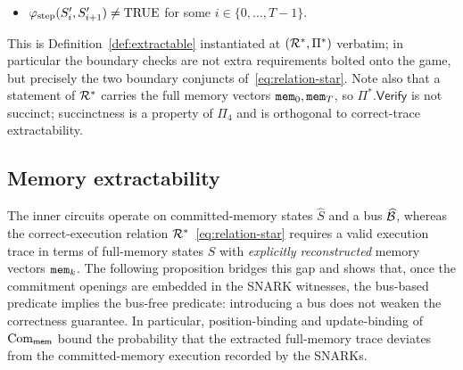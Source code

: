 \begin{remark}
\begin{enumerate}
\begin{itemize}
        $\mem_T' \neq \mem_T$; or
      \item $\varphi_{\mathrm{step}}(S_i', S_{i+1}') \neq \mathrm{TRUE}$ for some
        $i \in \{0,\ldots,T-1\}$.
    \end{itemize}
\end{enumerate}
This is Definition~\ref{def:extractable} instantiated at $(\mathcal{R}^*,\Pi^*)$
verbatim; in particular the boundary checks are not extra requirements bolted
onto the game, but precisely the two boundary conjuncts
of~\eqref{eq:relation-star}.  Note also that a statement of $\mathcal{R}^*$
carries the full memory vectors $\mathtt{mem}_0,\mathtt{mem}_T$, so $\Pi^*.\mathsf{Verify}$ is
not succinct; succinctness is a property of $\Pi_4$ and is orthogonal to
correct-trace extractability.
\end{remark}

\subsection{Memory extractability}\label{sec:security:bus}
The inner circuits operate on committed-memory states $\hat{S}$ and a bus
$\widehat{\mathcal{B}}$, whereas the correct-execution relation
$\mathcal{R}^*$~\eqref{eq:relation-star} requires a valid
execution trace in terms of full-memory states $S$ with \emph{explicitly
reconstructed} memory vectors $\mathtt{mem}_k$.  The following proposition bridges
this gap and shows that, once the commitment openings are embedded in the
SNARK witnesses, the bus-based predicate implies the bus-free predicate:
introducing a bus does not weaken the correctness guarantee.  In particular,
position-binding and update-binding of $\mathrm{Com}_{\mathsf{mem}}$ bound the
probability that the extracted full-memory trace deviates from the
committed-memory execution recorded by the SNARKs.

